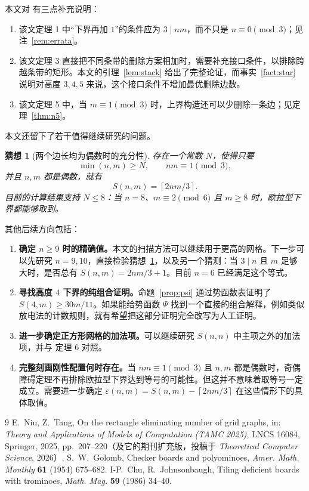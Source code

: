 \documentclass[11pt]{ctexart}
\newtheorem{conjecture}[theorem]{猜想}
\theoremstyle{definition}
\newcommand{\ceil}[1]{\left\lceil #1 \right\rceil}
\begin{document}
本文对 \cite{NT25} 有三点补充说明：

\begin{enumerate}
\item 该文定理 1 中“下界再加 $1$”的条件应为 $3\mid nm$，而不只是 $n\equiv0\pmod3$；见注~\ref{rem:errata}。
\item 该文定理 3 直接把不同条带的删除方案相加时，需要补充接口条件，以排除跨越条带的矩形。本文的引理~\ref{lem:stack} 给出了完整论证，而事实~\ref{fact:star} 说明对高度 $3,4,5$ 来说，这个接口条件不增加最优删除边数。
\item 该文定理 5 中，当 $m\equiv1\pmod3$ 时，上界构造还可以少删除一条边；见定理~\ref{thm:n5}。
\end{enumerate}

本文还留下了若干值得继续研究的问题。

\begin{conjecture}[两个边长均为偶数时的充分性]\label{conj:even}
存在一个常数 $N$，使得只要
\[
\min(n,m)\ge N,\qquad nm\equiv1\pmod3,
\]
并且 $n,m$ 都是偶数，就有
\[
S(n,m)=\ceil{2nm/3}.
\]
目前的计算结果支持 $N\le8$：当 $n=8$、$m\equiv2\pmod6$ 且 $m\ge8$ 时，欧拉型下界都能够取到。
\end{conjecture}

其他后续方向包括：

\begin{enumerate}
\item \textbf{确定 $n\ge9$ 时的精确值。}本文的扫描方法可以继续用于更高的网格。下一步可以先研究 $n=9,10$，直接检验猜想~\ref{conj:even}，以及另一个猜测：当 $3\mid n$ 且 $m$ 足够大时，是否总有
$S(n,m)=2nm/3+1$。目前 $n=6$ 已经满足这个等式。
\item \textbf{寻找高度 $4$ 下界的纯组合证明。}命题~\ref{prop:psi} 通过势函数表证明了 $S(4,m)\ge30m/11$。如果能给势函数 $\Psi$ 找到一个直接的组合解释，例如类似放电法的计数规则，就有希望把这部分证明完全改写为人工证明。
\item \textbf{进一步确定正方形网格的加法项。}可以继续研究 $S(n,n)$ 中主项之外的加法项，并与 \cite{NT25} 定理 6 对照。
\item \textbf{完整刻画刚性配置何时存在。}当 $nm\equiv1\pmod3$ 且 $n,m$ 都是偶数时，奇偶障碍定理不再排除欧拉型下界达到等号的可能性。但这并不意味着取等号一定成立。需要进一步确定
$\varepsilon(n,m)=S(n,m)-\ceil{2nm/3}$
在这些情形下的具体取值。
\end{enumerate}
\begin{thebibliography}{9}
 E.~Niu, Z.~Tang, On the rectangle eliminating number of grid graphs, in: \emph{Theory and Applications of Models of Computation (TAMC 2025)}, LNCS 16084, Springer, 2025, pp.~207--220（及它的期刊扩充版，投稿于 \emph{Theoretical Computer Science}, 2026）.
 S.~W.~Golomb, Checker boards and polyominoes, \emph{Amer. Math. Monthly} \textbf{61} (1954) 675--682.
 I-P.~Chu, R.~Johnsonbaugh, Tiling deficient boards with trominoes, \emph{Math. Mag.} \textbf{59} (1986) 34--40.
\end{thebibliography}
\end{document}
